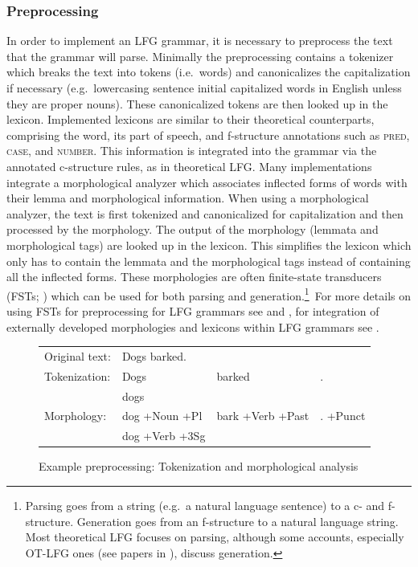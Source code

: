 \documentclass[output=paper,hidelinks]{langscibook}
\begin{document}
\subsubsection{Preprocessing} 
In order to implement an LFG grammar, it is necessary to preprocess the text that the grammar will parse.  Minimally the preprocessing contains a tokenizer which breaks the text into tokens (i.e.\ words) and canonicalizes the capitalization if necessary (e.g.\ lowercasing sentence initial capitalized words in English unless they are proper nouns). These canonicalized tokens are then looked up in the lexicon. Implemented lexicons are similar to their theoretical counterparts, comprising the word, its part of speech, and f-structure annotations such as \textsc{pred}, \textsc{case}, and \textsc{number}. This information is integrated into the grammar via the annotated c-structure rules,  as in theoretical LFG. Many implementations  integrate a morphological analyzer which associates inflected forms of words with their lemma and morphological information. When using a morphological analyzer, the text is first tokenized and canonicalized for capitalization and then processed by the morphology. The output of the morphology (lemmata and morphological tags) are  looked up in the lexicon.  This simplifies the lexicon which only has to contain the lemmata and the morphological tags instead of containing all the inflected forms. These morphologies are often finite-state transducers (FSTs; \cite{beesleykarttunen03}) which can be used for both parsing and generation.\footnote{Parsing goes from a string (e.g.\ a natural language sentence) to a c- and f-structure. Generation goes from an f-structure to a natural language string. Most theoretical LFG focuses on parsing, although some accounts, especially OT-LFG ones (see papers in \cite{sells2001}), discuss generation.}\ For more details on using FSTs for preprocessing for LFG grammars see \cite{kaplanetal04} and \cite{boegelbuttking2019}, for integration of externally developed morphologies and lexicons within LFG grammars see \cite{kaplannewman97}.


\begin{figure}[ht]
\begin{tabular}{llll}
 Original text:&  \multicolumn{3}{l}{Dogs   barked. }\\
 Tokenization:   & Dogs & barked & .\\
 & dogs &  & \\
 Morphology: & dog +Noun +Pl  & bark +Verb +Past & . +Punct\\
 & dog +Verb +3Sg & &\\
\end{tabular}
\caption{Example preprocessing: Tokenization and morphological analysis}
\label{table:tokmorph}
\end{figure}
\end{document}
